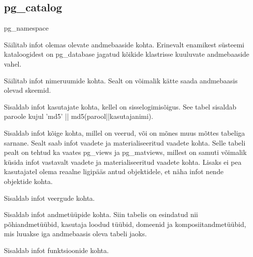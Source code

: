 \documentclass[a4paper,12pt]{article} %
\begin{document}
\subsection{pg\_catalog}
\begin{labeling}{pg\_namespace}
\item [pg\_database] Säilitab infot olemas olevate andmebaaside kohta. Erinevalt enamikest süsteemi kataloogidest on pg\_database jagatud kõikide klastrisse kuuluvate andmebaaside vahel.
\item [pg\_namespace] Säilitab infot nimeruumide kohta. Sealt on võimalik kätte saada andmebaasis olevad skeemid.
\item [pg\_shadow] Sisaldab infot kasutajate kohta, kellel on sisselogimisõigus. See tabel sisaldab paroole kujul 'md5' || md5(parool||kasutajanimi).
\item [pg\_class] Sisaldab infot kõige kohta, millel on veerud, või on mõnes muus mõttes tabeliga sarnane. Sealt saab infot vaadete ja materialiseeritud vaadete kohta. Selle tabeli pealt on tehtud ka vaates pg\_views ja pg\_matviews, millest on samuti võimalik küsida infot vastavalt vaadete ja materialiseeritud vaadete kohta. Lisaks ei pea kasutajatel olema reaalne ligipääs antud objektidele, et näha infot nende objektide kohta.
\item [pg\_attribute] Sisaldab infot veergude kohta.
\item [pg\_type] Sisaldab infot andmetüüpide kohta. Siin tabelis on esindatud nii põhiandmetüübid, kasutaja loodud tüübid, domeenid ja komposiitandmetüübid, mis luuakse iga andmebaasis oleva tabeli jaoks.
\item [pg\_proc] Sisaldab infot funktsioonide kohta.
\end{labeling}
\cite{PostgreSQLSystemCatalogs}
\end{document}

